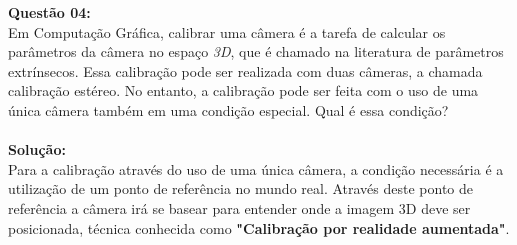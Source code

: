 \vspace{1cm}
\noindent\textbf{Questão 04:}\\
Em Computação Gráfica, calibrar uma câmera é a tarefa de calcular os parâmetros da câmera no espaço \emph{3D}, que é chamado na literatura de parâmetros extrínsecos. Essa calibração pode ser realizada com duas câmeras, a chamada calibração estéreo. No entanto, a calibração pode ser feita com o uso de uma única câmera também em uma condição especial. Qual é essa condição?\\
\\
\noindent\textbf{Solução:}
\\
Para a calibração através do uso de uma única câmera, a condição necessária é a utilização de um ponto de referência no mundo real. Através deste ponto de referência a câmera irá se basear para entender onde a imagem 3D deve ser posicionada, técnica conhecida como \textbf{"Calibração por realidade aumentada"}.

